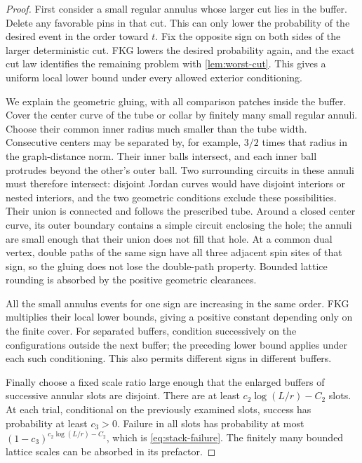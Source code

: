\begin{proof}
First consider a small regular annulus whose larger cut lies in the
buffer.  Delete any favorable pins in that cut.  This can only lower the
probability of the desired event in the order toward $t$.  Fix the
opposite sign on both sides of the larger deterministic cut.  FKG lowers
the desired probability again, and the exact cut law identifies the
remaining problem with \cref{lem:worst-cut}.  This gives a uniform local
lower bound under every allowed exterior conditioning.

We explain the geometric gluing, with all comparison patches inside the buffer.  Cover the center curve of the tube
or collar by finitely many small regular annuli.  Choose their common
inner radius much smaller than the tube width.  Consecutive centers may
be separated by, for example, $3/2$ times that radius in the graph-distance
norm.  Their inner balls intersect, and each inner ball protrudes beyond
the other's outer ball.  Two surrounding circuits in these annuli must
therefore intersect: disjoint Jordan curves would have disjoint interiors
or nested interiors, and the two geometric conditions exclude these
possibilities.  Their union is connected and follows the prescribed
tube.  Around a closed center curve, its outer boundary contains a simple
circuit enclosing the hole; the annuli are small enough that their union
does not fill that hole.  At a common dual vertex, double paths of the
same sign have all three adjacent spin sites of that sign, so the gluing
does not lose the double-path property.  Bounded lattice rounding is
absorbed by the positive geometric clearances.

All the small annulus events for one sign are increasing in the same
order.  FKG multiplies their local lower bounds, giving a positive
constant depending only on the finite cover.  For separated buffers,
condition successively on the configurations outside the next buffer;
the preceding lower bound applies under each such conditioning.  This
also permits different signs in different buffers.

Finally choose a fixed scale ratio large enough that the enlarged buffers
of successive annular slots are disjoint.  There are at least
$c_2\log(L/r)-C_2$ slots.  At each trial, conditional on the previously
examined slots, success has probability at least $c_3>0$.  Failure in all
slots has probability at most $(1-c_3)^{c_2\log(L/r)-C_2}$, which is
\eqref{eq:stack-failure}.  The finitely many bounded lattice scales can be
absorbed in its prefactor.
\end{proof}

